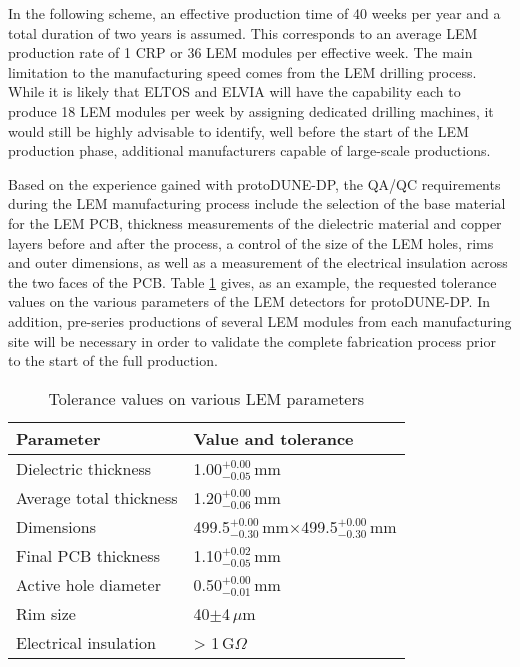In the following scheme, an effective production time of 40 weeks per year and a total duration of two years is assumed. This corresponds to an average LEM production rate of 1 CRP or 36 LEM modules per effective week. The main limitation to the manufacturing speed comes from the LEM drilling process. While it is likely that ELTOS and ELVIA will have the capability each to produce 18 LEM modules per week by assigning dedicated drilling machines, it would still be highly advisable to identify, well before the start of the LEM production phase, additional manufacturers capable of large-scale productions. 

Based on the experience gained with protoDUNE-DP, the QA/QC requirements during the LEM manufacturing process include the selection of the base material for the LEM PCB, thickness measurements of the dielectric material and copper layers before and after the process, a control of the size of the LEM holes, rims and outer dimensions, as 
well as a measurement of the electrical insulation across the two faces of the PCB.  
Table \ref{tab:LEM_Tolerance} gives, as an example, the requested tolerance values on the various parameters of the LEM detectors for protoDUNE-DP. In addition, pre-series productions of several LEM modules from each manufacturing site will be necessary in order to validate the complete fabrication process prior to the start of the full production.

\begin{table}[h!]
\begin{center}
\begin{tabular}{p{}p{}}
\hline
\hline
 Parameter & Value and tolerance\\
\hline
Dielectric thickness & 1.00$^{+0.00}_{-0.05}$\,mm \\
Average total thickness & 1.20$^{+0.00}_{-0.06}$\,mm \\
Dimensions & 499.5$^{+0.00}_{-0.30}$\,mm$\times$499.5$^{+0.00}_{-0.30}$\,mm \\
Final PCB thickness & 1.10$^{+0.02}_{-0.05}$\,mm \\
Active hole diameter & 0.50$^{+0.00}_{-0.01}$\,mm \\
Rim size & 40$\pm$4\,$\mu$m \\
Electrical insulation & > 1\,G$\Omega$ \\
\hline
\hline
\end{tabular}
\caption{Tolerance values on various LEM parameters }
\label{tab:LEM_Tolerance}
\end{center} 
\end{table} 

